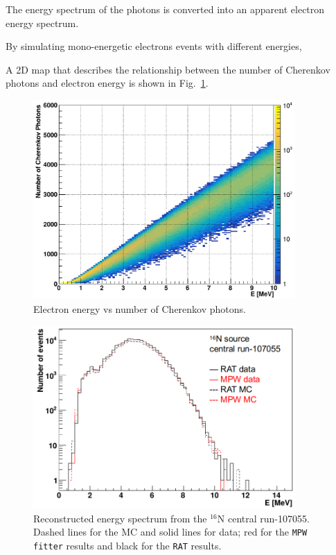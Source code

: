The energy spectrum of the photons is converted into an apparent electron energy spectrum\cite{waterunidoc}.

By simulating mono-energetic electrons events with different energies,

A 2D map that describes the relationship between the number of Cherenkov photons and electron energy is shown in Fig.~\ref{N16energyMap}.  

\begin{figure}[htbp]
	\centering
	\includegraphics[width=10cm]{2dmap_EvsNphoton.png}
	\caption{Electron energy vs number of Cherenkov photons.}
	\label{N16energyMap}
\end{figure}

\begin{figure}[htbp]
	\centering
	\includegraphics[width=10cm]{N16_reconE_107055.png}
	\caption[Reconstructed energy spectrum from the $^{16}$N central run-107055.]{Reconstructed energy spectrum from the $^{16}$N central run-107055. Dashed lines for the MC and solid lines for data; red for the \texttt{MPW fitter} results and black for the \texttt{RAT} results.}
	\label{N16energy}
\end{figure}

